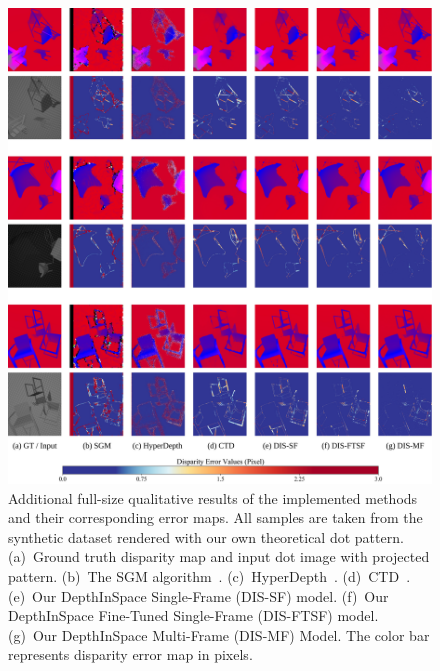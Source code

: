 \begin{figure}
    \begin{center}
        \includegraphics[width=1\linewidth]{images/chapter2/supp_figures/supp_results_2.jpg}
    \end{center}
   \caption{Additional full-size qualitative results of the implemented methods and their corresponding error maps. All samples are taken from the synthetic dataset rendered with our own theoretical dot pattern. (a)~Ground truth disparity map and input dot image with projected pattern. (b)~The SGM algorithm~\citep{hirschmuller2007stereo}. (c)~HyperDepth~\citep{ryan2016hyperdepth}. (d)~CTD~\citep{riegler2019connecting}. (e)~Our DepthInSpace Single-Frame (DIS-SF) model. (f)~Our DepthInSpace Fine-Tuned Single-Frame (DIS-FTSF) model. (g)~Our DepthInSpace Multi-Frame (DIS-MF) Model. The color bar represents disparity error map in pixels.}
    \label{fig:c2_sim_results}
\end{figure}

